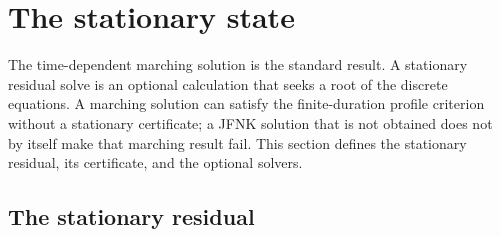 \section{The stationary state}
\label{sec:steady}

The time-dependent marching solution is the standard result. A stationary
residual solve is an optional calculation that seeks a root of the discrete
equations. A marching solution can satisfy the finite-duration profile
criterion without a stationary certificate; a JFNK solution that is not
obtained does not by itself make that marching result fail. This section
defines the stationary residual, its certificate, and the optional solvers.

\subsection{The stationary residual}
\label{sec:steady:residual}

